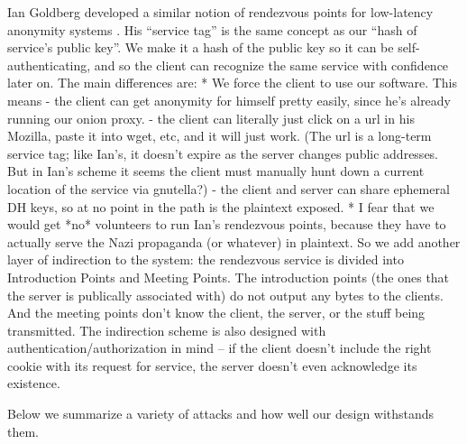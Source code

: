 \documentclass[times,10pt,twocolumn]{article}
\begin{document}
Ian Goldberg developed a similar notion of rendezvous points for
low-latency anonymity systems \cite{goldberg-thesis}. His ``service tag''
is the same concept as our ``hash of service's public key''. We make it
a hash of the public key so it can be self-authenticating, and so the
client can recognize the same service with confidence later on.
The main differences are:
* We force the client to use our software. This means
   - the client can get anonymity for himself pretty easily, since he's
     already running our onion proxy.
   - the client can literally just click on a url in his Mozilla, paste it
     into wget, etc, and it will just work. (The url is a long-term
     service tag; like Ian's, it doesn't expire as the server changes
     public addresses. But in Ian's scheme it seems the client must
     manually hunt down a current location of the service via gnutella?)
   - the client and server can share ephemeral DH keys, so at no point
     in the path is the plaintext exposed.
* I fear that we would get *no* volunteers to run Ian's rendezvous points,
  because they have to actually serve the Nazi propaganda (or whatever)
  in plaintext. So we add another layer of indirection to the system:
  the rendezvous service is divided into Introduction Points and
  Meeting Points. The introduction points (the ones that the server is
  publically associated with) do not output any bytes to the clients. And
  the meeting points don't know the client, the server, or the stuff
  being transmitted. The indirection scheme is also designed with
  authentication/authorization in mind -- if the client doesn't include
  the right cookie with its request for service, the server doesn't even
  acknowledge its existence.



\label{sec:maintaining-anonymity}

\label{subsec:many-messages}


\label{sec:attacks}

Below we summarize a variety of attacks and how well our design withstands
them.


\label{sec:conclusion}
\end{document}
